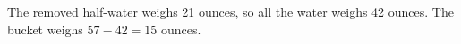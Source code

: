 The removed half-water weighs 21 ounces, so all the water weighs 42 ounces. The bucket weighs $57-42=\boxed{15}$ ounces.
